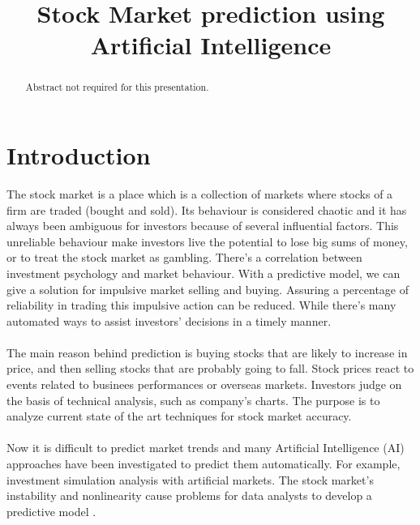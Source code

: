 \documentclass[conference]{IEEEtran}
\begin{document}
\title{Stock Market prediction using \\Artificial Intelligence}
\author{
}
\maketitle
\begin{abstract}
Abstract not required for this presentation.
\end{abstract}
\IEEEpeerreviewmaketitle
\section{Introduction}
The stock market is a place which is a collection of markets where stocks of a firm are traded (bought and sold)\cite{M2018}.
Its behaviour is considered chaotic \cite{Singh2016} and it has always been ambiguous for investors
because of several influential factors. This unreliable behaviour make investors live the potential to lose big sums of money, or to treat
the stock market as gambling. There's a correlation between investment psychology and market behaviour. With a predictive model, we can give a 
solution for impulsive market selling and buying. Assuring a percentage of reliability in trading this impulsive action can be reduced. While there's many automated ways to assist investors' decisions
in a timely manner\cite{nabipour2020predicting}.
\\\\
The main reason behind prediction is buying stocks that are likely to increase in price, and then selling stocks that are probably going to fall\cite{nabipour2020predicting}. 
Stock prices react to events related to businees performances or overseas markets. Investors judge on the basis of technical analysis, such as company's charts\cite{Akita2016}. 
The purpose is to analyze current state of the art techniques for stock market accuracy\cite{Singh2016}.
\\\\
Now it is difficult to predict market trends and many Artificial Intelligence (AI) approaches
have been investigated to predict them automatically. For example, investment simulation analysis with artificial
 markets\cite{Akita2016}. The stock market's instability and nonlinearity cause problems for data analysts to develop a predictive model \cite{nabipour2020predicting}.
\end{document}
